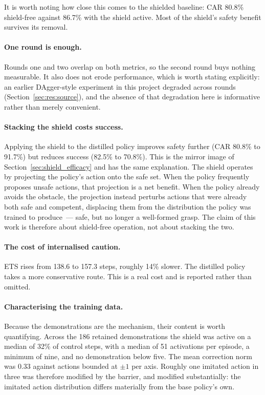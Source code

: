 \documentclass[a4paper,11pt]{report}
\begin{document}
It is worth noting how close this comes to the shielded baseline: CAR 80.8\% shield-free against
86.7\% with the shield active. Most of the shield's safety benefit survives its removal.

\paragraph{One round is enough.}
Rounds one and two overlap on both metrics, so the second round buys nothing measurable. It also
does not erode performance, which is worth stating explicitly: an earlier DAgger-style experiment
in this project degraded across rounds (Section~\ref{sec:res:source}), and the absence of that
degradation here is informative rather than merely convenient.

\paragraph{Stacking the shield costs success.}
Applying the shield to the distilled policy improves safety further (CAR 80.8\% to 91.7\%) but
reduces success (82.5\% to 70.8\%). This is the mirror image of Section~\ref{sec:shield_efficacy}
and has the same explanation. The shield operates by projecting the policy's action onto the safe
set. When the policy frequently proposes unsafe actions, that projection is a net benefit. When the
policy already avoids the obstacle, the projection instead perturbs actions that were already both
safe and competent, displacing them from the distribution the policy was trained to produce~---
safe, but no longer a well-formed grasp. The claim of this work is therefore about shield-free
operation, not about stacking the two.

\paragraph{The cost of internalised caution.}
ETS rises from 138.6 to 157.3 steps, roughly 14\% slower. The distilled policy takes a more
conservative route. This is a real cost and is reported rather than omitted.

\paragraph{Characterising the training data.}
Because the demonstrations are the mechanism, their content is worth quantifying. Across the 186
retained demonstrations the shield was active on a median of 32\% of control steps, with a median
of 51 activations per episode, a minimum of nine, and no demonstration below five. The mean
correction norm was 0.33 against actions bounded at $\pm 1$ per axis. Roughly one imitated action
in three was therefore modified by the barrier, and modified substantially: the imitated action
distribution differs materially from the base policy's own.
\end{document}
